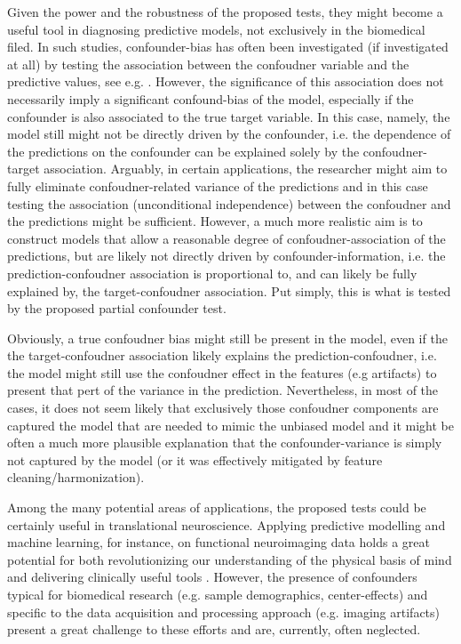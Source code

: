 \documentclass{article}
\begin{document}
Given the power and the robustness of the proposed tests, they might become a useful tool in diagnosing predictive models, not exclusively in the biomedical filed. 
In such studies, confounder-bias has often been investigated (if investigated at all) by testing the association between the confoudner variable and the predictive values, see e.g. \citep{spisak2020pain}.
However, the significance of this association does not necessarily imply a significant confound-bias of the model, especially if the confounder is also associated to the true target variable. In this case, namely, the model still might not be directly driven by the confounder, i.e. the dependence of the predictions on the confounder can be explained solely by the confoudner-target association. 
Arguably, in certain applications, the researcher might aim to fully eliminate confoudner-related variance of the predictions and in this case testing the association (unconditional independence) between the confoudner and the predictions might be sufficient. However, a much more realistic aim is to construct models that allow a reasonable degree of confoudner-association of the predictions, but are likely not directly driven by confounder-information, i.e. the prediction-confoudner association is proportional to, and can likely be fully explained by, the target-confoudner association.
Put simply, this is what is tested by the proposed partial confounder test.

Obviously, a true confoudner bias might still be present in the model, even if the the target-confoudner association likely explains the prediction-confoudner, i.e. the model might still use the confoudner effect in the features (e.g artifacts) to present that pert of the variance in the prediction. Nevertheless, in most of the cases, it does not seem likely that exclusively those confoudner components are captured the model that are needed to mimic the unbiased model and it might be often a much more plausible explanation that the confounder-variance is simply not captured by the model (or it was effectively mitigated by feature cleaning/harmonization).

Among the many potential areas of applications, the proposed tests could be certainly useful in translational neuroscience. Applying predictive modelling and machine learning, for instance, on functional neuroimaging data holds a great potential for both revolutionizing our understanding of the physical basis of mind and delivering clinically useful tools \citep{woo2017building, wager2013fmri, spisak2020pain}. However, the presence of confounders typical for biomedical research (e.g. sample demographics, center-effects) and specific to the data acquisition and processing approach (e.g. imaging artifacts) present a great challenge to these efforts and are, currently, often neglected.
\end{document}
